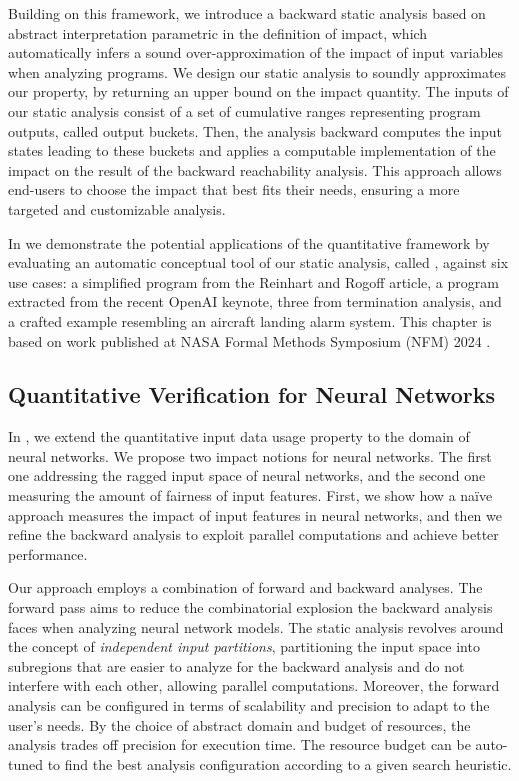 Building on this framework, we introduce a backward static analysis based on abstract interpretation parametric in the definition of impact, which automatically infers a sound over-approximation of the impact of input variables when analyzing programs. We design our static analysis to soundly approximates our property, by returning an upper bound on the impact quantity.
The inputs of our static analysis consist of a set of cumulative ranges representing program outputs, called output buckets.
Then, the analysis backward computes the input states leading to these buckets and applies a computable implementation of the impact on the result of the backward reachability analysis.
This approach allows end-users to choose the impact that best fits their needs, ensuring a more targeted and customizable analysis.

In  we demonstrate the potential applications of the quantitative framework by evaluating an automatic conceptual tool of our static analysis, called \impatto, against six use cases: a simplified program from the Reinhart and Rogoff article, a program extracted from the recent OpenAI keynote, three from termination analysis, and a crafted example resembling an aircraft landing alarm system. This chapter is based on work published at NASA Formal Methods Symposium (NFM) 2024 .


\subsection{Quantitative Verification for Neural Networks}

In , we extend the quantitative input data usage property to the domain of neural networks.
We propose two impact notions for neural networks. The first one addressing the ragged input space of neural networks, and the second one measuring the amount of fairness of input features.
First, we show how a na\"ive approach measures the impact of input features in neural networks, and then we refine the backward analysis to exploit parallel computations and achieve better performance.

Our approach employs a combination of forward and backward analyses.
The forward pass aims to reduce the combinatorial explosion the backward analysis faces when analyzing neural network models.
The static analysis revolves around the concept of \emph{independent input partitions}, partitioning the input space into subregions that are easier to analyze for the backward analysis and do not interfere with each other, allowing parallel computations.
Moreover, the forward analysis can be configured in terms of scalability and precision to adapt to the user's needs. By the choice of abstract domain and budget of resources, the analysis trades off precision for execution time.
The resource budget can be auto-tuned to find the best analysis configuration according to a given search heuristic.

